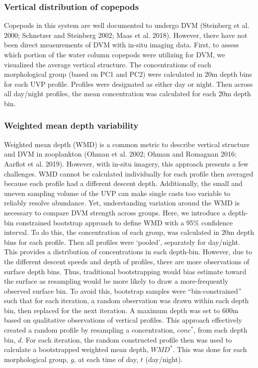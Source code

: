 \documentclass[
]{article}
\begin{document}
\hypertarget{vertical-distribution-of-copepods}{%
\subsubsection{Vertical distribution of
copepods}\label{vertical-distribution-of-copepods}}

Copepods in this system are well documented to undergo DVM (Steinberg et
al. 2000; Schnetzer and Steinberg 2002; Maas et al. 2018). However,
there have not been direct measurements of DVM with in-situ imaging
data. First, to assess which portion of the water column copepods were
utilizing for DVM, we visualized the average vertical structure. The
concentrations of each morphological group (based on PC1 and PC2) were
calculated in 20m depth bins for each UVP profile. Profiles were
designated as either day or night. Then across all day/night profiles,
the mean concentration was calculated for each 20m depth bin.

\hypertarget{weighted-mean-depth-variability}{%
\subsubsection{Weighted mean depth
variability}\label{weighted-mean-depth-variability}}

Weighted mean depth (WMD) is a common metric to describe vertical
structure and DVM in zooplankton (Ohman et al. 2002; Ohman and Romagnan
2016; Aarflot et al. 2019). However, with in-situ imagery, this approach
presents a few challenges. WMD cannot be calculated individually for
each profile then averaged because each profile had a different descent
depth. Additionally, the small and uneven sampling volume of the UVP can
make single casts too variable to reliably resolve abundance. Yet,
understanding variation around the WMD is necessary to compare DVM
strength across groups. Here, we introduce a depth-bin constrained
bootstrap approach to define WMD with a 95\% confidence interval. To do
this, the concentration of each group, was calculated in 20m depth bins
for each profile. Then all profiles were `pooled', separately for
day/night. This provides a distribution of concentrations in each
depth-bin. However, due to the different descent speeds and depth of
profiles, there are more observations of surface depth bins. Thus,
traditional bootstrapping would bias estimate toward the surface as
resampling would be more likely to draw a more-frequently observed
surface bin. To avoid this, bootstrap samples were ``bin-constrained''
such that for each iteration, a random observation was drawn within each
depth bin, then replaced for the next iteration. A maximum depth was set
to 600m based on qualitative observations of vertical profiles. This
approach effectively created a random profile by resampling a
concentration, \(conc^*\), from each depth bin, \(d\). For each
iteration, the random constructed profile then was used to calculate a
bootstrapped weighted mean depth, \(WMD^*\). This was done for each
morphological group, \(g\), at each time of day, \(t\) (day/night).
\end{document}
